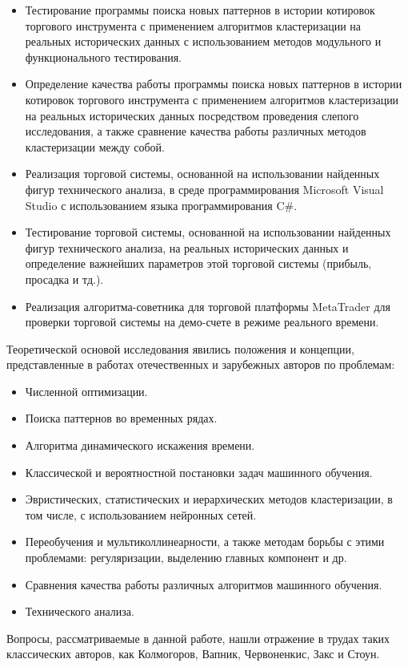 \documentclass[a4paper, 14pt]{extarticle}
\numberwithin{figure}{subsection}
\numberwithin{equation}{subsection}
\begin{document}
\begin{itemize}
\item Тестирование программы поиска новых паттернов в истории котировок торгового инструмента с применением алгоритмов кластеризации на реальных исторических данных с использованием методов модульного и функционального тестирования.
\item Определение качества работы программы поиска новых паттернов в истории котировок торгового инструмента с применением алгоритмов кластеризации на реальных исторических данных посредством проведения слепого исследования, а также сравнение качества работы различных методов кластеризации между собой.
\item Реализация торговой системы, основанной на использовании найденных фигур технического анализа, в среде программирования Microsoft Visual Studio с использованием языка программирования C\#.
\item Тестирование торговой системы, основанной на использовании найденных фигур технического анализа, на реальных исторических данных и определение важнейших параметров этой торговой системы (прибыль, просадка и тд.).
\item Реализация алгоритма-советника для торговой платформы MetaTrader для проверки
торговой системы на демо-счете в режиме реального времени.
\end{itemize}

Теоретической основой исследования явились положения и концепции, представленные в
работах отечественных и зарубежных авторов по проблемам:

\begin{itemize}
\item Численной оптимизации.
\item Поиска паттернов во временных рядах.
\item Алгоритма динамического искажения времени.
\item Классической и вероятностной постановки задач машинного обучения.
\item Эвристических, статистических и иерархических методов кластеризации, в том числе, с использованием нейронных сетей.
\item Переобучения и мультиколлинеарности, а также методам борьбы с этими проблемами:
регуляризации, выделению главных компонент и др.
\item Сравнения качества работы различных алгоритмов машинного обучения.
\item Технического анализа.
\end{itemize}

Вопросы, рассматриваемые в данной работе, нашли отражение в трудах таких классических авторов, как Колмогоров, Вапник, Червоненкис, Закс и Стоун.
\end{document}
